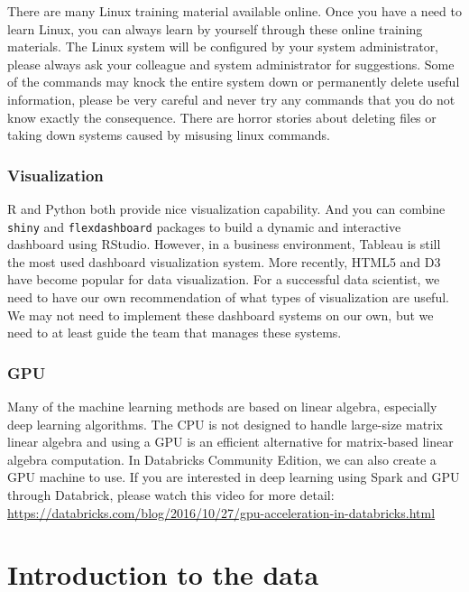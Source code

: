 \documentclass[]{book}
\theoremstyle{definition}
\theoremstyle{definition}
\theoremstyle{remark}
\begin{document}
There are many Linux training material available online. Once you have a
need to learn Linux, you can always learn by yourself through these
online training materials. The Linux system will be configured by your
system administrator, please always ask your colleague and system
administrator for suggestions. Some of the commands may knock the entire
system down or permanently delete useful information, please be very
careful and never try any commands that you do not know exactly the
consequence. There are horror stories about deleting files or taking
down systems caused by misusing linux commands.

\subsection{Visualization}\label{visualization}

R and Python both provide nice visualization capability. And you can
combine \texttt{shiny} and \texttt{flexdashboard} packages to build a
dynamic and interactive dashboard using RStudio. However, in a business
environment, Tableau is still the most used dashboard visualization
system. More recently, HTML5 and D3 have become popular for data
visualization. For a successful data scientist, we need to have our own
recommendation of what types of visualization are useful. We may not
need to implement these dashboard systems on our own, but we need to at
least guide the team that manages these systems.

\subsection{GPU}\label{gpu}

Many of the machine learning methods are based on linear algebra,
especially deep learning algorithms. The CPU is not designed to handle
large-size matrix linear algebra and using a GPU is an efficient
alternative for matrix-based linear algebra computation. In Databricks
Community Edition, we can also create a GPU machine to use. If you are
interested in deep learning using Spark and GPU through Databrick,
please watch this video for more detail:
\url{https://databricks.com/blog/2016/10/27/gpu-acceleration-in-databricks.html}

\chapter{Introduction to the data}\label{introduction-to-the-data}
\end{document}
